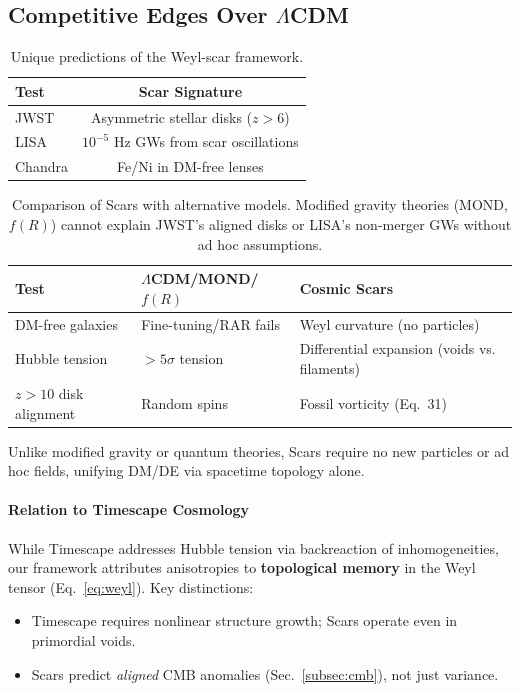\documentclass{article}
\begin{document}
\subsection{Competitive Edges Over $\Lambda$CDM}
\begin{table}[H]
    \centering
    \begin{tabular}{lc}
        \hline
        \textbf{Test} & \textbf{Scar Signature} \\
        \hline
        JWST & Asymmetric stellar disks ($z > 6$) \\
        LISA & $10^{-5}$ Hz GWs from scar oscillations \\
        Chandra & Fe/Ni in DM-free lenses \\
        \hline
    \end{tabular}
    \caption{Unique predictions of the Weyl-scar framework.}
    \label{tab:signatures}
\end{table}


\begin{table}[H]
    \centering
    \begin{tabularx}{\textwidth}{l>{\raggedright\arraybackslash}X>{\raggedright\arraybackslash}X}
        \hline
        \textbf{Test} & \textbf{$\Lambda$CDM/MOND/$f(R)$} & \textbf{Cosmic Scars} \\  %
        \hline
        DM-free galaxies & Fine-tuning/RAR fails & Weyl curvature (no particles) \\
        Hubble tension & $>5\sigma$ tension & Differential expansion (voids vs. filaments) \\
        $z>10$ disk alignment & Random spins & Fossil vorticity (Eq.~31) \\
        \hline
    \end{tabularx}
    \caption{Comparison of Scars with alternative models. Modified gravity theories (MOND, $f(R)$) cannot explain JWST's aligned disks or LISA's non-merger GWs without ad hoc assumptions.}
    \label{tab:comparison}
\end{table}

Unlike modified gravity or quantum theories, Scars require no new particles or ad hoc fields, unifying DM/DE via spacetime topology alone.

\paragraph{Relation to Timescape Cosmology}  
While Timescape \cite{Timescape2023} addresses Hubble tension via backreaction of inhomogeneities,  
our framework attributes anisotropies to \textbf{topological memory} in the Weyl tensor (Eq.~\ref{eq:weyl}).  
Key distinctions:  
\begin{itemize}  
    \item Timescape requires nonlinear structure growth; Scars operate even in primordial voids.  
    \item Scars predict \textit{aligned} CMB anomalies (Sec.~\ref{subsec:cmb}), not just variance.  
\end{itemize}  
\end{document}
